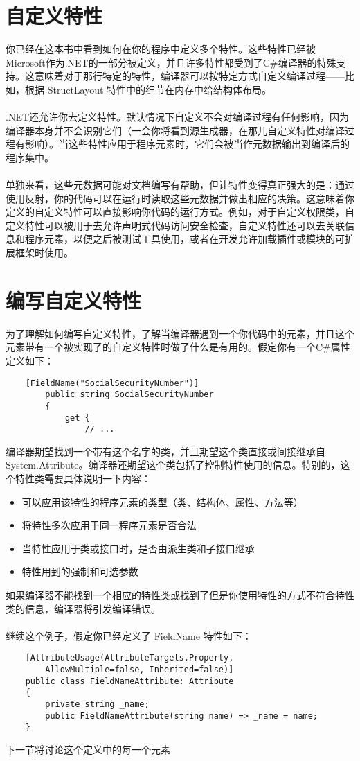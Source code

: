 \section{自定义特性}
你已经在这本书中看到如何在你的程序中定义多个特性。这些特性已经被Microsoft作为.NET的一部分被定义，并且许多特性都受到了C\#编译器的特殊支持。这意味着对于那行特定的特性，编译器可以按特定方式自定义编译过程——比如，根据 StructLayout 特性中的细节在内存中给结构体布局。
\\ \\
.NET还允许你去定义特性。默认情况下自定义不会对编译过程有任何影响，因为编译器本身并不会识别它们（一会你将看到源生成器，在那儿自定义特性对编译过程有影响）。当这些特性应用于程序元素时，它们会被当作元数据输出到编译后的程序集中。
\\ \\
单独来看，这些元数据可能对文档编写有帮助，但让特性变得真正强大的是：通过使用反射，你的代码可以在运行时读取这些元数据并做出相应的决策。这意味着你定义的自定义特性可以直接影响你代码的运行方式。例如，对于自定义权限类，自定义特性可以被用于去允许声明式代码访问安全检查，自定义特性还可以去关联信息和程序元素，以便之后被测试工具使用，或者在开发允许加载插件或模块的可扩展框架时使用。

\section{编写自定义特性}
为了理解如何编写自定义特性，了解当编译器遇到一个你代码中的元素，并且这个元素带有一个被实现了的自定义特性时做了什么是有用的。假定你有一个C\#属性定义如下：
\begin{verbatim}
    [FieldName("SocialSecurityNumber")]
        public string SocialSecurityNumber
        {
            get {
                // ...
\end{verbatim}
编译器期望找到一个带有这个名字的类，并且期望这个类直接或间接继承自 System.Attribute。编译器还期望这个类包括了控制特性使用的信息。特别的，这个特性类需要具体说明一下内容：
\begin{itemize}
    \item 可以应用该特性的程序元素的类型（类、结构体、属性、方法等）
    \item 将特性多次应用于同一程序元素是否合法
    \item 当特性应用于类或接口时，是否由派生类和子接口继承
    \item 特性用到的强制和可选参数
\end{itemize}
如果编译器不能找到一个相应的特性类或找到了但是你使用特性的方式不符合特性类的信息，编译器将引发编译错误。
\\ \\
继续这个例子，假定你已经定义了 FieldName 特性如下：
\begin{verbatim}
    [AttributeUsage(AttributeTargets.Property,
        AllowMultiple=false, Inherited=false)]
    public class FieldNameAttribute: Attribute
    {
        private string _name;
        public FieldNameAttribute(string name) => _name = name;
    }
\end{verbatim}
下一节将讨论这个定义中的每一个元素

